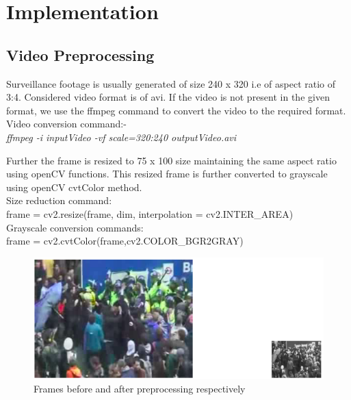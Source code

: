 \chapter{Implementation}
\section{Video Preprocessing}
Surveillance footage is usually generated of size 240 x 320 i.e of aspect ratio of 3:4. Considered video format is of avi. If the video is not present in the given format, we use the ffmpeg command to convert the video to the required format. 
\\
Video conversion command:-\\
\textit{ffmpeg -i {inputVideo} -vf scale=320:240 outputVideo.avi}
\par
Further the frame is resized to 75 x 100 size maintaining the same aspect ratio using openCV functions. This resized frame is further converted to grayscale using openCV cvtColor method. \\
Size reduction command:\\
frame = cv2.resize(frame, dim, interpolation = cv2.INTER\_AREA)\\
Grayscale conversion commands: \\
frame = cv2.cvtColor(frame,cv2.COLOR\_BGR2GRAY)
\begin{center}
\begin{figure}[H]
\centering
\includegraphics[width = \linewidth]{frame_resize.png}
\caption{Frames before and after preprocessing respectively}
\end{figure}
\end{center}
